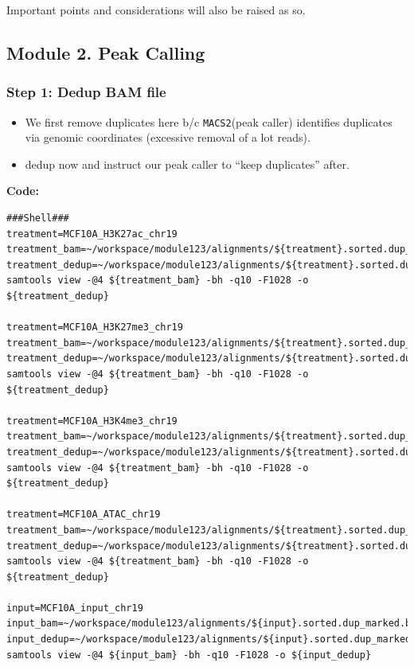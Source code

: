 \documentclass[
]{book}
\providecommand{\tightlist}{%
  \setlength{\itemsep}{0pt}\setlength{\parskip}{0pt}}
\begin{document}
Important points and considerations will also be raised as so.

\subsection{Module 2. Peak Calling}\label{module-2.-peak-calling}

\subsubsection{Step 1: Dedup BAM file}\label{step-1-dedup-bam-file}

\begin{itemize}
\tightlist
\item
  We first remove duplicates here b/c \texttt{MACS2}(peak caller) identifies duplicates via genomic coordinates (excessive removal of a lot reads).
\item
  dedup now and instruct our peak caller to ``keep duplicates'' after.
\end{itemize}

\textbf{Code:}

\begin{verbatim}
###Shell###
treatment=MCF10A_H3K27ac_chr19
treatment_bam=~/workspace/module123/alignments/${treatment}.sorted.dup_marked.bam
treatment_dedup=~/workspace/module123/alignments/${treatment}.sorted.dup_marked.dedup.bam
samtools view -@4 ${treatment_bam} -bh -q10 -F1028 -o ${treatment_dedup}

treatment=MCF10A_H3K27me3_chr19
treatment_bam=~/workspace/module123/alignments/${treatment}.sorted.dup_marked.bam
treatment_dedup=~/workspace/module123/alignments/${treatment}.sorted.dup_marked.dedup.bam
samtools view -@4 ${treatment_bam} -bh -q10 -F1028 -o ${treatment_dedup}

treatment=MCF10A_H3K4me3_chr19
treatment_bam=~/workspace/module123/alignments/${treatment}.sorted.dup_marked.bam
treatment_dedup=~/workspace/module123/alignments/${treatment}.sorted.dup_marked.dedup.bam
samtools view -@4 ${treatment_bam} -bh -q10 -F1028 -o ${treatment_dedup}

treatment=MCF10A_ATAC_chr19
treatment_bam=~/workspace/module123/alignments/${treatment}.sorted.dup_marked.bam
treatment_dedup=~/workspace/module123/alignments/${treatment}.sorted.dup_marked.dedup.bam
samtools view -@4 ${treatment_bam} -bh -q10 -F1028 -o ${treatment_dedup}

input=MCF10A_input_chr19
input_bam=~/workspace/module123/alignments/${input}.sorted.dup_marked.bam
input_dedup=~/workspace/module123/alignments/${input}.sorted.dup_marked.dedup.bam
samtools view -@4 ${input_bam} -bh -q10 -F1028 -o ${input_dedup}
\end{verbatim}
\end{document}
